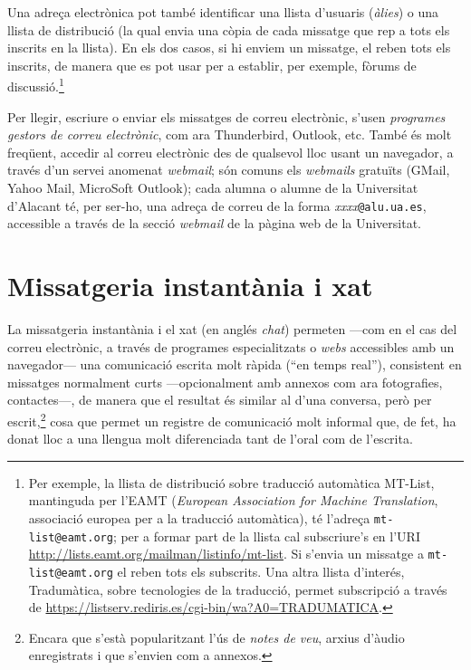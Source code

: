 Una adreça electrònica pot també identificar una llista d'usuaris
(\emph{àlies}) o una llista de distribució (la qual envia una còpia de
cada missatge que rep a tots els inscrits en la llista). En els dos
casos, si hi enviem un missatge, el reben tots els inscrits, de manera
que es pot usar per a establir, per exemple, fòrums de
discussió.\footnote{Per exemple, la llista de distribució sobre
  traducció automàtica MT-List, mantinguda per l'EAMT (\emph{European
    Association for Machine Translation}, associació europea per a la
  traducció automàtica), té l'adreça \texttt{mt-list@eamt.org}; per a
  formar part de la llista cal subscriure's en l'URI
  \url{http://lists.eamt.org/mailman/listinfo/mt-list}. Si s'envia un
  missatge a \texttt{mt-list@eamt.org} el reben tots els
  subscrits. Una altra llista d'interés, Tradumàtica, sobre
  tecnologies de la traducció, permet subscripció a través de
  \url{https://listserv.rediris.es/cgi-bin/wa?A0=TRADUMATICA}.}


Per llegir, escriure o enviar els missatges de correu electrònic,
s'usen \emph{programes gestors de correu electrònic}, com ara
Thunderbird, Outlook, etc.  També és molt freqüent, accedir al correu
electrònic des de qualsevol lloc usant un navegador, a través d'un
servei anomenat \emph{webmail}; són comuns els \emph{webmails}
gratuïts (GMail, Yahoo Mail, MicroSoft Outlook); cada alumna o alumne
de la Universitat d'Alacant té, per ser-ho, una adreça de correu de la
forma \emph{xxxx}\texttt{@alu.ua.es}, accessible a través de la secció
\emph{webmail} de la pàgina web de la Universitat.


\section{Missatgeria instantània i xat}
\label{ss:missinst}
La missatgeria instantània i el xat (en anglés \emph{chat}) permeten
---com en el cas del correu electrònic, a través de programes
especialitzats o \emph{webs} accessibles amb un navegador--- una
comunicació escrita molt ràpida (``en temps real''), consistent en
missatges normalment curts ---opcionalment amb annexos com ara
fotografies, contactes---, de manera que el resultat és similar al
d'una conversa, però per escrit,\footnote{Encara que s'està
  popularitzant l'ús de \emph{notes de veu}, arxius d'àudio
  enregistrats i que s'envien com a annexos.} cosa que permet un
registre de comunicació molt informal que, de fet, ha donat lloc a una
llengua molt diferenciada tant de l'oral com de l'escrita.

